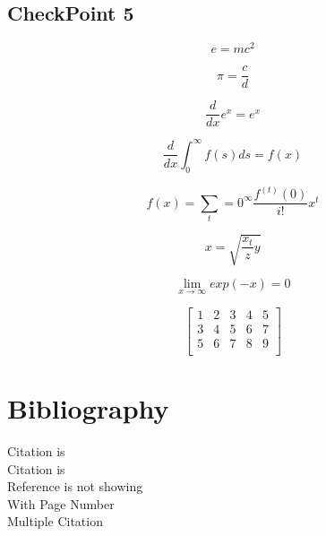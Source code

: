 \documentclass[a4paper,12pt]{article}
\begin{document}
{\subsection{CheckPoint 5}

\begin{equation}
e=mc^2
\end{equation}

\begin{equation}
\pi=\frac{c}{d}
\end{equation}

\begin{equation}
\frac{d}{dx}e^x=e^x
\end{equation}

\begin{equation}
\frac{d}{dx}\int_0^\infty f(s)ds=f(x)
\end{equation}

\begin{equation}
f(x)=\sum_t=0^\infty \frac{f^{(t)}(0)}{i!}x^t
\end{equation}

\begin{equation}
x=\sqrt{\frac{x_t}{z}y}
\end{equation}

\begin{equation}
\lim_{x \to \infty} exp(-x)=0
\end{equation}

\begin{equation}
\left[
\begin{matrix}
1 & 2 & 3 & 4 & 5\\
3 & 4 & 5 & 6 &  7\\
5 & 6 & 7 & 8 & 9\\
\end{matrix}
\right]
\end{equation}

\section{Bibliography}

Citation is \citep{Birdetal2001}\\
Citation is \cite{goldberg1988genetic}\\
Reference is not showing\nocite{goldberg1988genetic}\\
With Page Number \cite[p. 215]{Birdetal2001}\\
Multiple Citation \cite{goldberg1988genetic,nasrabadi2007pattern,rasmussen2004gaussian,Birdetal2001}\\

}
\end{document}
